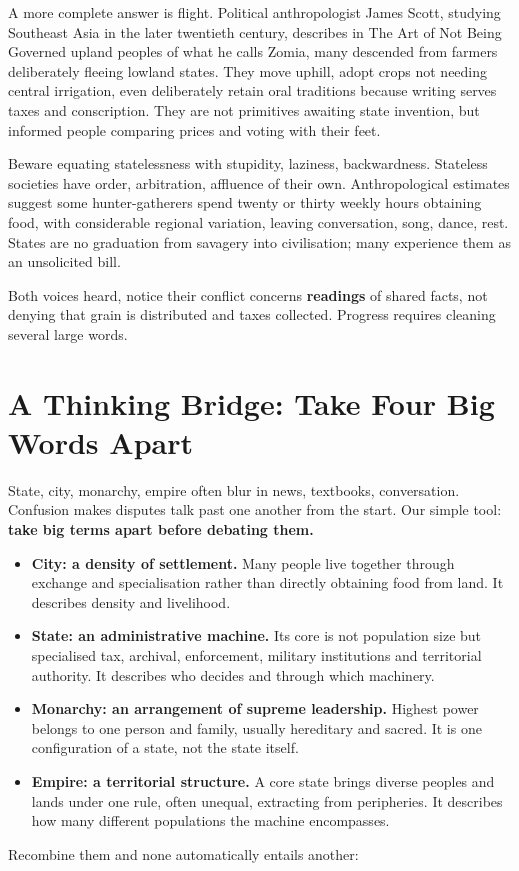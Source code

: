 A more complete answer is flight. Political anthropologist James Scott, studying Southeast Asia in the later twentieth century, describes in The Art of Not Being Governed upland peoples of what he calls Zomia, many descended from farmers deliberately fleeing lowland states. They move uphill, adopt crops not needing central irrigation, even deliberately retain oral traditions because writing serves taxes and conscription. They are not primitives awaiting state invention, but informed people comparing prices and voting with their feet.

Beware equating statelessness with stupidity, laziness, backwardness. Stateless societies have order, arbitration, affluence of their own. Anthropological estimates suggest some hunter-gatherers spend twenty or thirty weekly hours obtaining food, with considerable regional variation, leaving conversation, song, dance, rest. States are no graduation from savagery into civilisation; many experience them as an unsolicited bill.

Both voices heard, notice their conflict concerns \textbf{readings} of shared facts, not denying that grain is distributed and taxes collected. Progress requires cleaning several large words.

\section[Thinking Bridge: Separate Four Terms]{A Thinking Bridge: Take Four Big Words Apart}
State, city, monarchy, empire often blur in news, textbooks, conversation. Confusion makes disputes talk past one another from the start. Our simple tool: \textbf{take big terms apart before debating them.}

\begin{itemize}
\item \textbf{City: a density of settlement.} Many people live together through exchange and specialisation rather than directly obtaining food from land. It describes density and livelihood.
\item \textbf{State: an administrative machine.} Its core is not population size but specialised tax, archival, enforcement, military institutions and territorial authority. It describes who decides and through which machinery.
\item \textbf{Monarchy: an arrangement of supreme leadership.} Highest power belongs to one person and family, usually hereditary and sacred. It is one configuration of a state, not the state itself.
\item \textbf{Empire: a territorial structure.} A core state brings diverse peoples and lands under one rule, often unequal, extracting from peripheries. It describes how many different populations the machine encompasses.
\end{itemize}
Recombine them and none automatically entails another:

